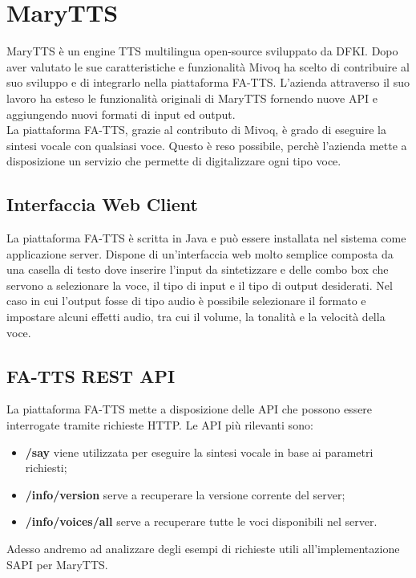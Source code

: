 \newpage
\section{MaryTTS}
MaryTTS è un engine TTS multilingua open-source sviluppato da DFKI. Dopo aver valutato le sue caratteristiche e funzionalità Mivoq ha scelto di contribuire al suo sviluppo e di integrarlo nella piattaforma FA-TTS.
L'azienda attraverso il suo lavoro ha esteso le funzionalità originali di MaryTTS fornendo nuove API e aggiungendo nuovi formati di input ed output.\\
La piattaforma FA-TTS, grazie al contributo di Mivoq, è grado di eseguire la sintesi vocale con qualsiasi voce. Questo è reso possibile, perchè l'azienda mette a disposizione un servizio che permette di digitalizzare ogni tipo voce.
\subsection{Interfaccia Web Client}
La piattaforma FA-TTS è scritta in Java e può essere installata nel sistema come applicazione server.
Dispone di un'interfaccia web molto semplice composta da una casella di testo dove inserire l'input da sintetizzare e delle combo box che servono a selezionare la voce, il tipo di input e il tipo di output desiderati.
Nel caso in cui l'output fosse di tipo audio è possibile selezionare il formato e impostare alcuni effetti audio, tra cui il volume, la tonalità e la velocità della voce.
\subsection{FA-TTS REST API}
La piattaforma FA-TTS mette a disposizione delle API che possono essere interrogate tramite richieste HTTP.
Le API più rilevanti sono:
\begin{itemize}
	\item \textbf{/say} viene utilizzata per eseguire la sintesi vocale in base ai parametri richiesti;
	\item \textbf{/info/version} serve a recuperare la versione corrente del server;
	\item \textbf{/info/voices/all} serve a recuperare tutte le voci disponibili nel server.
\end{itemize}
Adesso andremo ad analizzare degli esempi di richieste utili all'implementazione SAPI per MaryTTS.
